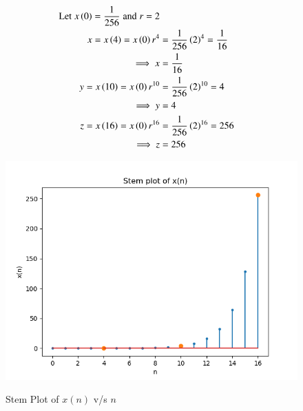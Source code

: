 \documentclass[journal,12pt,twocolumn]{IEEEtran}
\theoremstyle{remark}
\begin{document}
\begin{enumerate}
\begin{align}
    \text{Let}\;x\left(0\right) =\frac{1}{256}\;\text{and}\;r = 2\\      x=x\left(4\right)=x\left(0\right)r^4 &=\frac{1}{256}\left(2\right)^4=\frac{1}{16}\\
     \implies x&=\frac{1}{16} \\
     y=x\left(10\right)=x\left(0\right)r^{10} &=\frac{1}{256}\left(2\right)^{10}=4\\
     \implies y&=4 \\
     z=x\left(16\right)=x\left(0\right)r^{16} &=\frac{1}{256}\left(2\right)^{16}=256\\
    \implies z&=256 
\end{align}
\newpage
\begin{figure}[h]
    \renewcommand\thefigure{1}
    \centering
    \caption{Stem Plot of $x(n)$ v/s $n$}
    \includegraphics[width=\columnwidth]{A_1.png}
        \label{fig:1}
\end{figure}


\end{enumerate}
\end{document}
